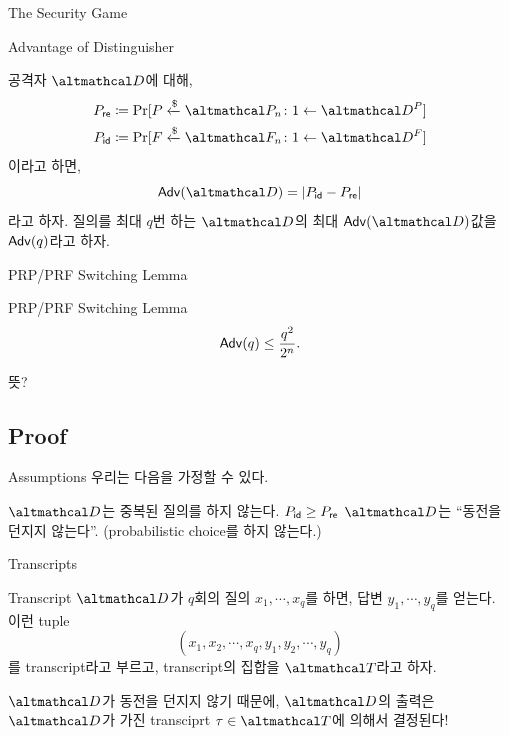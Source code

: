 \documentclass[../250428_msquare_provable_security.tex]{subfiles}
\begin{document}
\begin{frame}{The Security Game}
    \begin{block}{Advantage of Distinguisher}
        \begin{itemize}
            \ii
            공격자 \(\mcal{D}\)에 대해,
            \begin{align*}
                P_{\msf{re}} &\coloneqq \Pr[P \dgets \mcal{P}_n \colon 1 \gets \mcal{D}^{P}] \\
                P_{\msf{id}} &\coloneqq \Pr[F \dgets \mcal{F}_n \colon 1 \gets \mcal{D}^{F}]
            \end{align*}
            이라고 하면,
            \[
                \msf{Adv}(\mcal{D}) = |P_{\msf{id}} - P_{\msf{re}}|
            \]
            라고 하자.
            \ii
            질의를 최대 \(q\)번 하는 \(\mcal{D}\)의 최대 \(\msf{Adv}(\mcal{D})\)값을
            \(\mathsf{Adv}(q)\)라고 하자.
            \end{itemize}
    \end{block}

\end{frame}

\begin{frame}{PRP/PRF Switching Lemma}
    \begin{block}{PRP/PRF Switching Lemma}
        \[
            \mathsf{Adv}(q) \le \frac{q^2}{2^n}\text.
        \]
    \end{block}

    뜻?
\end{frame}

\subsection{Proof}
\begin{frame}{Assumptions}
    우리는 다음을 가정할 수 있다.
    \pause
    \begin{enumerate}
        \ii \(\mcal{D}\)는 중복된 질의를 하지 않는다.
        \pause
        \ii \(P_{\mathsf{id}} \ge P_{\mathsf{re}}\)
        \pause
        \ii \(\mcal{D}\)는 ``동전을 던지지 않는다''. (probabilistic choice를 하지 않는다.)
    \end{enumerate}
\end{frame}

\begin{frame}{Transcripts}
    \begin{block}{Transcript}
        \(\mcal{D}\)가 \(q\)회의 질의
        \(x_1, \cdots, x_q\)를 하면,
        답변 \(y_1, \cdots, y_q\)를 얻는다.
        이런 tuple
        \[
            (x_1, x_2, \cdots, x_q, y_1, y_2, \cdots, y_q)
        \]
        를 transcript라고 부르고, transcript의 집합을 \(\mcal{T}\)라고 하자.
    \end{block}
    \pause

    \begin{alertblock}{}
        \(\mcal{D}\)가 동전을 던지지 않기 때문에,
        \(\mcal{D}\)의 출력은 \(\mcal{D}\)가 가진 transciprt \(\tau \in \mcal{T}\)에 의해서 결정된다!
    \end{alertblock}
\end{frame}
\end{document}
